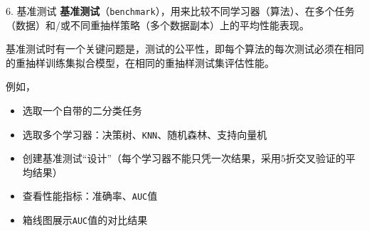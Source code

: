 \documentclass[
  11pt,
  ignorenonframetext,
  dvipsnames,UTF8]{beamer}
\providecommand{\tightlist}{%
  \setlength{\itemsep}{0pt}\setlength{\parskip}{0pt}}
\begin{document}
\begin{frame}[fragile]{6. 基准测试}
\protect\hypertarget{ux57faux51c6ux6d4bux8bd5}{}
\textbf{基准测试}（\texttt{benchmark}），用来比较不同学习器（算法）、在多个任务（数据）和/或不同重抽样策略（多个数据副本）上的平均性能表现。

基准测试时有一个关键问题是，测试的公平性，即每个算法的每次测试必须在相同的重抽样训练集拟合模型，在相同的重抽样测试集评估性能。

例如，

\begin{itemize}
\tightlist
\item
  选取一个自带的二分类任务
\item
  选取多个学习器：决策树、\texttt{KNN}、随机森林、支持向量机
\item
  创建基准测试``设计''（每个学习器不能只凭一次结果，采用\(5\)折交叉验证的平均结果）
\item
  查看性能指标：准确率、\texttt{AUC}值
\item
  箱线图展示\texttt{AUC}值的对比结果
\end{itemize}
\end{frame}
\end{document}
